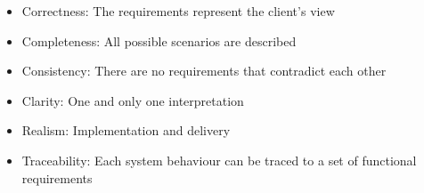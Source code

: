 \documentclass{article}
\begin{document}
	\begin{itemize}
		\item Correctness: The requirements represent the client's view
		\item Completeness: All possible scenarios are described
		\item Consistency: There are no requirements that contradict each other
		\item Clarity: One and only one interpretation
		\item Realism: Implementation and delivery
		\item Traceability: Each system behaviour can be traced to a set of functional requirements
	\end{itemize}		
	
\end{document}
